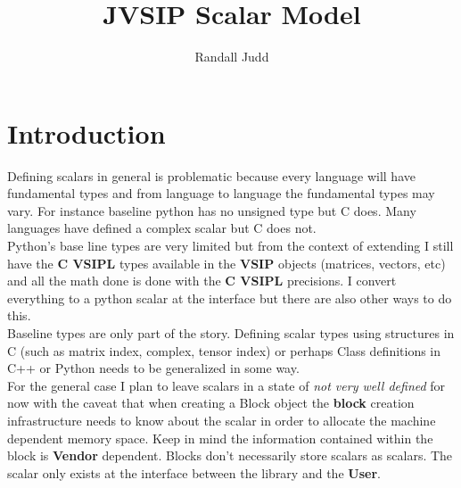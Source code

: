 \documentclass[11pt, oneside]{article}
\title{JVSIP Scalar Model}
\author{Randall Judd}
\newcommand{\cvl}{\ttbf{C VSIPL}}
\newcommand{\ttbf}[1]{{\ttfamily \bfseries #1}}
\begin{document}
\maketitle
 \section{Introduction}
 Defining scalars in general is problematic because every language will have fundamental types and from language to language the fundamental types may vary. For instance baseline python has no unsigned type but C does. Many languages have defined a complex scalar but  C does not. 
 \\[6pt]
 Python's base line types are very limited but from the context of extending I still have the \cvl{} types available in the \ttbf{VSIP} objects (matrices, vectors, etc) and all the math done is done with the \cvl{} precisions. I convert everything to a python scalar at the interface but there are also other ways to do this.
 \\[6pt]
 Baseline types are only part of the story.  Defining scalar types using structures in C (such as matrix index, complex, tensor index) or perhaps Class definitions in C++ or Python needs to be generalized in some way.  
 \\[6pt]
 For the general case I plan to leave scalars in a state of \emph{not very well defined} for now with the caveat that when creating a Block object the \ttbf{block} creation infrastructure needs to know about the scalar in order to allocate the machine dependent memory space.  Keep in mind the information contained within the block is \ttbf{Vendor} dependent. Blocks don't necessarily store scalars as scalars.  The scalar only exists at the interface between the library and the \ttbf{User}.
 
\end{document}
